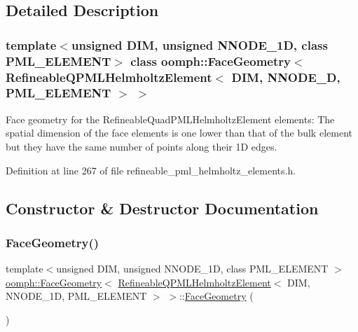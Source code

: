 \subsection{Detailed Description}
\subsubsection*{template$<$unsigned D\+IM, unsigned N\+N\+O\+D\+E\+\_\+1D, class P\+M\+L\+\_\+\+E\+L\+E\+M\+E\+NT$>$\newline
class oomph\+::\+Face\+Geometry$<$ Refineable\+Q\+P\+M\+L\+Helmholtz\+Element$<$ D\+I\+M, N\+N\+O\+D\+E\+\_\+D, P\+M\+L\+\_\+\+E\+L\+E\+M\+E\+N\+T $>$ $>$}

Face geometry for the Refineable\+Quad\+P\+M\+L\+Helmholtz\+Element elements\+: The spatial dimension of the face elements is one lower than that of the bulk element but they have the same number of points along their 1D edges. 

Definition at line 267 of file refineable\+\_\+pml\+\_\+helmholtz\+\_\+elements.\+h.



\subsection{Constructor \& Destructor Documentation}
\mbox{\label{classoomph_1_1FaceGeometry_3_01RefineableQPMLHelmholtzElement_3_01DIM_00_01NNODE__1D_00_01PML__ELEMENT_01_4_01_4_ad46c030cf94cf9cabbd95a54bb779826}} 
\subsubsection{\texorpdfstring{Face\+Geometry()}{FaceGeometry()}}
{\footnotesize\ttfamily template$<$unsigned D\+IM, unsigned N\+N\+O\+D\+E\+\_\+1D, class P\+M\+L\+\_\+\+E\+L\+E\+M\+E\+NT $>$ \\
\hyperlink{classoomph_1_1FaceGeometry}{oomph\+::\+Face\+Geometry}$<$ \hyperlink{classoomph_1_1RefineableQPMLHelmholtzElement}{Refineable\+Q\+P\+M\+L\+Helmholtz\+Element}$<$ D\+IM, N\+N\+O\+D\+E\+\_\+1D, P\+M\+L\+\_\+\+E\+L\+E\+M\+E\+NT $>$ $>$\+::\hyperlink{classoomph_1_1FaceGeometry}{Face\+Geometry} (\begin{DoxyParamCaption}{ }\end{DoxyParamCaption})\hspace{0.3cm}{\ttfamily [inline]}}



